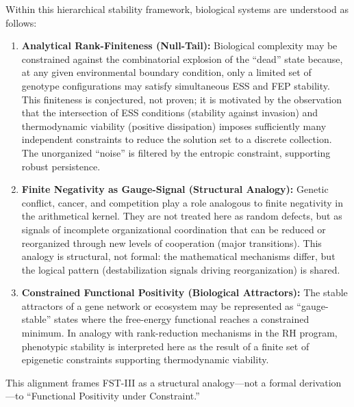 \documentclass[12pt,a4paper]{article}
\theoremstyle{remark}
\begin{document}
Within this hierarchical stability framework, biological systems are understood as follows:
\begin{enumerate}[label=\alph*)]
    \item \textbf{Analytical Rank-Finiteness (Null-Tail):} Biological complexity may be constrained against the combinatorial explosion of the ``dead'' state because, at any given environmental boundary condition, only a limited set of genotype configurations may satisfy simultaneous ESS and FEP stability. This finiteness is conjectured, not proven; it is motivated by the observation that the intersection of ESS conditions (stability against invasion) and thermodynamic viability (positive dissipation) imposes sufficiently many independent constraints to reduce the solution set to a discrete collection. The unorganized ``noise'' is filtered by the entropic constraint, supporting robust persistence.
    \item \textbf{Finite Negativity as Gauge-Signal (Structural Analogy):} Genetic conflict, cancer, and competition play a role analogous to finite negativity in the arithmetical kernel. They are not treated here as random defects, but as signals of incomplete organizational coordination that can be reduced or reorganized through new levels of cooperation (major transitions). This analogy is structural, not formal: the mathematical mechanisms differ, but the logical pattern (destabilization signals driving reorganization) is shared.
    \item \textbf{Constrained Functional Positivity (Biological Attractors):} The stable attractors of a gene network or ecosystem may be represented as ``gauge-stable'' states where the free-energy functional reaches a constrained minimum. In analogy with rank-reduction mechanisms in the RH program, phenotypic stability is interpreted here as the result of a finite set of epigenetic constraints supporting thermodynamic viability.
\end{enumerate}

This alignment frames FST-III as a structural analogy---not a formal derivation---to ``Functional Positivity under Constraint.''
\end{document}
